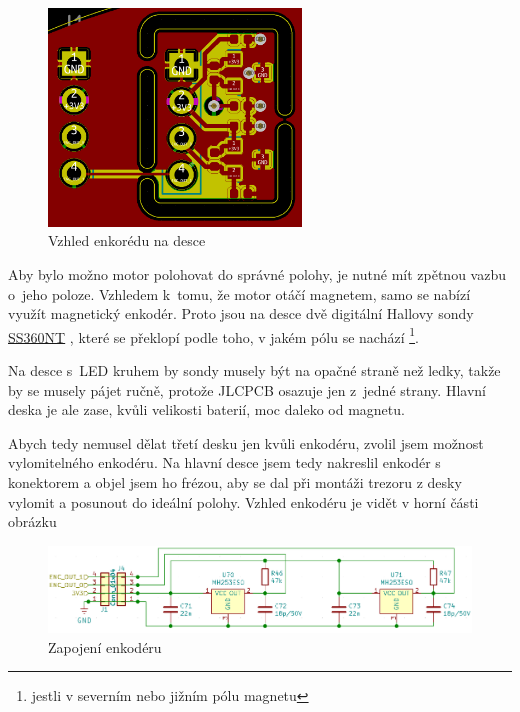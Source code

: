 \begin{figure}
    \centering
    \includegraphics[width= 0.6\textwidth]{kapitoly/obrazky/E4/ir_motor_enkoder/pcb-enc.png}
    \caption{\label{fig:E4-enkoder_pcb}Vzhled enkorédu na desce}
\end{figure}
Aby bylo možno motor polohovat do správné polohy, je nutné mít zpětnou vazbu o~jeho poloze. Vzhledem k~tomu, že motor otáčí magnetem, samo se nabízí využít magnetický enkodér. 
Proto jsou na desce dvě digitální Hallovy sondy \href{https://datasheet.lcsc.com/szlcsc/Honeywell-SS360ST_C111924.pdf}{SS360NT} \parencite{ss360nt}, které se překlopí podle toho, 
v jakém pólu se nachází \footnote{jestli v severním nebo jižním pólu magnetu}. 

Na desce s~LED kruhem by sondy musely být na opačné straně než ledky, takže by se musely pájet ručně, protože JLCPCB osazuje jen z~jedné strany. Hlavní deska je ale zase, 
kvůli velikosti baterií, moc daleko od magnetu. 

Abych tedy nemusel dělat třetí desku jen kvůli enkodéru, zvolil jsem možnost vylomitelného enkodéru. Na hlavní desce jsem tedy nakreslil 
enkodér s konektorem a objel jsem ho frézou, aby se dal při montáži trezoru z desky vylomit a posunout do ideální polohy.
Vzhled enkodéru je vidět v horní části obrázku 

\begin{figure}[htbp]
    \centering
    \includegraphics[width=\textwidth]{kapitoly/obrazky/E4/ir_motor_enkoder/enc.png}
    \caption{Zapojení enkodéru}
    \label{fig:E4-enkoder}
\end{figure}
